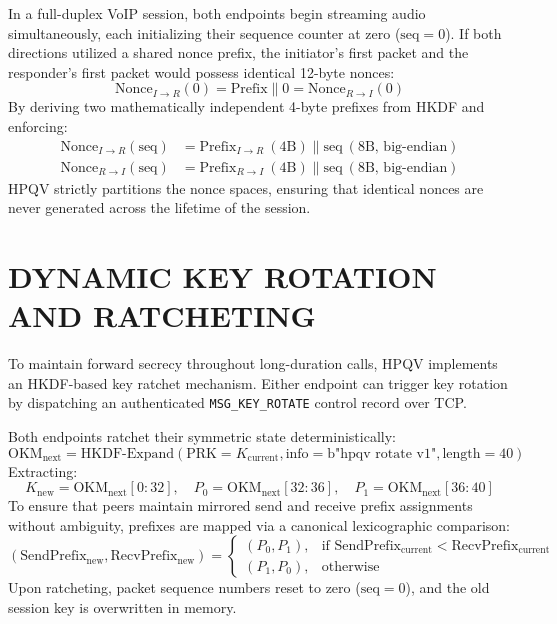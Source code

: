 In a full-duplex VoIP session, both endpoints begin streaming audio simultaneously, each initializing their sequence counter at zero ($\text{seq} = 0$). If both directions utilized a shared nonce prefix, the initiator's first packet and the responder's first packet would possess identical 12-byte nonces:
\begin{equation}
    \text{Nonce}_{I \to R}(0) = \text{Prefix} \parallel 0 = \text{Nonce}_{R \to I}(0)
\end{equation}
By deriving two mathematically independent 4-byte prefixes from HKDF and enforcing:
\begin{align}
    \text{Nonce}_{I \to R}(\text{seq}) &= \text{Prefix}_{I \to R}\ (4\text{B}) \parallel \text{seq}\ (8\text{B, big-endian}) \\
    \text{Nonce}_{R \to I}(\text{seq}) &= \text{Prefix}_{R \to I}\ (4\text{B}) \parallel \text{seq}\ (8\text{B, big-endian})
\end{align}
HPQV strictly partitions the nonce spaces, ensuring that identical nonces are never generated across the lifetime of the session.

\section{DYNAMIC KEY ROTATION AND RATCHETING}
To maintain forward secrecy throughout long-duration calls, HPQV implements an HKDF-based key ratchet mechanism. Either endpoint can trigger key rotation by dispatching an authenticated \texttt{MSG\_KEY\_ROTATE} control record over TCP.

Both endpoints ratchet their symmetric state deterministically:
\begin{equation}
    \text{OKM}_{\text{next}} = \text{HKDF-Expand}(\text{PRK} = K_{\text{current}}, \text{info} = \text{b"hpqv rotate v1"}, \text{length} = 40)
\end{equation}
Extracting:
\begin{equation}
    K_{\text{new}} = \text{OKM}_{\text{next}}[0:32],\quad P_0 = \text{OKM}_{\text{next}}[32:36],\quad P_1 = \text{OKM}_{\text{next}}[36:40]
\end{equation}
To ensure that peers maintain mirrored send and receive prefix assignments without ambiguity, prefixes are mapped via a canonical lexicographic comparison:
\begin{equation}
    (\text{SendPrefix}_{\text{new}}, \text{RecvPrefix}_{\text{new}}) = 
    \begin{cases}
        (P_0, P_1), & \text{if } \text{SendPrefix}_{\text{current}} < \text{RecvPrefix}_{\text{current}} \\
        (P_1, P_0), & \text{otherwise}
    \end{cases}
\end{equation}
Upon ratcheting, packet sequence numbers reset to zero ($\text{seq} = 0$), and the old session key is overwritten in memory.


